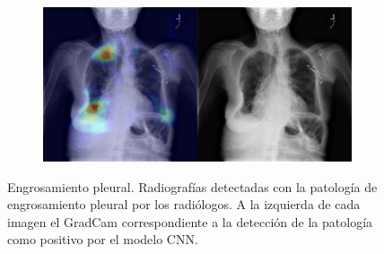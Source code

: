 \begin{figure}[b]
\begin{subfigure}{0.4\textwidth}
    \end{subfigure}
    \begin{subfigure}{0.4\textwidth}
        \centering
        \includegraphics[width=1.0\textwidth]{Chapters/5. Conclusiones/img/Pleural-Thickening/1_1_00023325_014.png}
    \end{subfigure}

    \caption[short]{Engrosamiento pleural. Radiografías detectadas con la patología de engrosamiento pleural por los
                    radiólogos. A la izquierda de cada imagen el GradCam correspondiente a la detección
                    de la patología como positivo por el modelo CNN.}
\end{figure}

